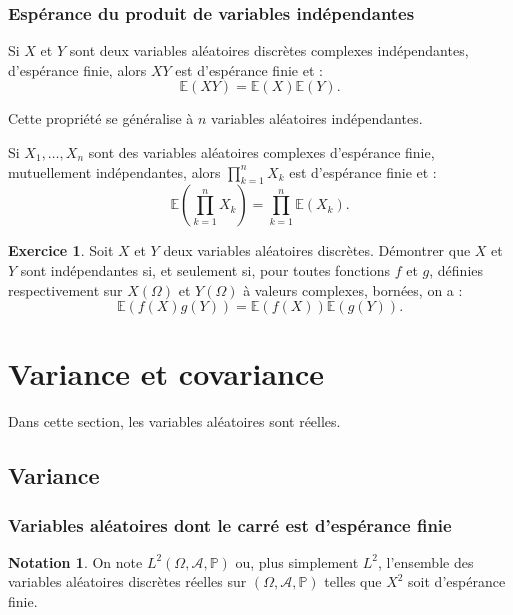 \documentclass[french]{article}
\renewcommand{\P}{\mathbb{P}}
\newcommand{\E}{\mathbb{E}}
\theoremstyle{plain}
\theoremstyle{definition}
\newtheorem{exo}{Exercice}
\newtheorem*{notation}{Notation}
\theoremstyle{remark}
\begin{document}
\subsubsection*{Espérance du produit de variables indépendantes}

\begin{thm}{}%
	Si $X$ et $Y$ sont deux variables aléatoires discrètes complexes indépendantes, d'espérance finie, alors $XY$ est d'espérance finie et : 
	$$\E(XY)=\E(X)\E(Y).$$
\end{thm}

Cette propriété se généralise à $n$ variables aléatoires indépendantes.

\begin{thm}{}%
	Si $X_1,\ldots,X_n$ sont des variables aléatoires complexes d'espérance finie, mutuellement indépendantes, alors $\displaystyle\prod_{k=1}^{n}X_k$ est d'espérance finie et :
	$$\E\left(\prod_{k=1}^{n}X_k\right)=\prod_{k=1}^{n}\E(X_k).$$
\end{thm}

\begin{exo}
	Soit $X$ et $Y$ deux variables aléatoires discrètes. Démontrer que $X$ et $Y$ sont indépendantes si, et seulement si, pour toutes fonctions $f$ et $g$, définies respectivement sur $X(\Omega)$ et $Y(\Omega)$ à valeurs complexes, bornées, on a :
	$$\E(f(X)g(Y))=\E(f(X))\E(g(Y)).$$
\end{exo}

\section{Variance et covariance}

Dans cette section, les variables aléatoires sont réelles.

\subsection{Variance}

\subsubsection*{Variables aléatoires dont le carré est d'espérance finie}

\begin{notation}
	On note $L^2(\Omega,\mathcal{A},\P)$ ou, plus simplement $L^2$, l'ensemble des variables aléatoires discrètes réelles sur $(\Omega,\mathcal{A},\P)$ telles que $X^2$ soit d'espérance finie.
\end{notation}
\end{document}
